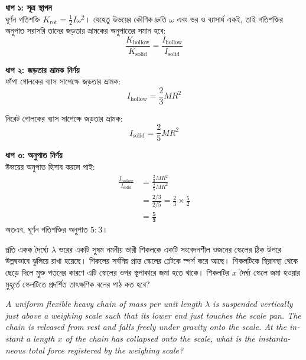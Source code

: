 \documentclass[12pt, a4paper]{article}
\begin{document}
\begin{tcolorbox}[solutionbox={সমাধান (Solution)}]
    \noindent
    \textbf{ধাপ ১: সূত্র স্থাপন} \\
    ঘূর্ণন গতিশক্তি $K_{\text{rot}} = \frac{1}{2} I \omega^2$। যেহেতু উভয়ের কৌণিক দ্রুতি $\omega$ এবং ভর ও ব্যাসার্ধ একই, তাই গতিশক্তির অনুপাত সরাসরি তাদের জড়তার ভ্রামকের অনুপাতের সমান হবে:
    \[ \frac{K_{\text{hollow}}}{K_{\text{solid}}} = \frac{I_{\text{hollow}}}{I_{\text{solid}}} \]
    
    \vspace{0.5em}
    \noindent\textbf{ধাপ ২: জড়তার ভ্রামক নির্ণয়} \\
    ফাঁপা গোলকের ব্যাস সাপেক্ষে জড়তার ভ্রামক:
    \[ I_{\text{hollow}} = \frac{2}{3} M R^2 \]
    
    নিরেট গোলকের ব্যাস সাপেক্ষে জড়তার ভ্রামক:
    \[ I_{\text{solid}} = \frac{2}{5} M R^2 \]
    
    \vspace{0.5em}
    \noindent\textbf{ধাপ ৩: অনুপাত নির্ণয়} \\
    উভয়ের অনুপাত হিসাব করলে পাই:
    \begin{align*}
        \frac{I_{\text{hollow}}}{I_{\text{solid}}} &= \frac{\frac{2}{3} M R^2}{\frac{2}{5} M R^2} \\
        &= \frac{2/3}{2/5} = \frac{2}{3} \times \frac{5}{2} \\
        &= \mathbf{\frac{5}{3}}
    \end{align*}
    অতএব, ঘূর্ণন গতিশক্তির অনুপাত $5 : 3$।
\end{tcolorbox}

\newpage

\begin{tcolorbox}[questionbox={প্রশ্ন (Question) 11}]
    \noindent
    প্রতি একক দৈর্ঘ্যে $\lambda$ ভরের একটি সুষম নমনীয় ভারী শিকলকে একটি সংবেদনশীল ওজনের স্কেলের ঠিক উপরে উল্লম্বভাবে ঝুলিয়ে রাখা হয়েছে। শিকলের সর্বনিম্ন প্রান্ত স্কেলের প্লেটকে স্পর্শ করে আছে। শিকলটিকে স্থিরাবস্থা থেকে ছেড়ে দিলে মুক্ত পতনের কারণে এটি স্কেলের ওপর স্তূপাকারে জমা হতে থাকে। শিকলটির $x$ দৈর্ঘ্য স্কেলে জমা হওয়ার মুহূর্তে স্কেলটিতে প্রদর্শিত তাৎক্ষণিক বলের পাঠ কত হবে?
    
    \vspace{0.8em}
    \begin{english}
    \noindent\textit{\color{darkgray}
    A uniform flexible heavy chain of mass per unit length $\lambda$ is suspended vertically just above a weighing scale such that its lower end just touches the scale pan. The chain is released from rest and falls freely under gravity onto the scale. At the instant a length $x$ of the chain has collapsed onto the scale, what is the instantaneous total force registered by the weighing scale?
    }
    \end{english}
\end{tcolorbox}
\end{document}
